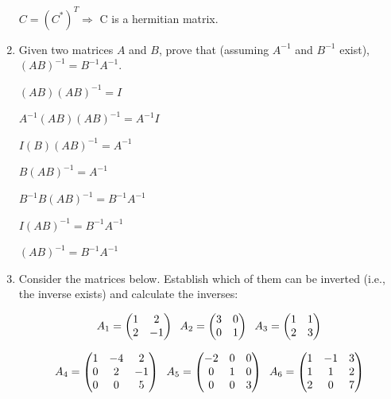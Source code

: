 \documentclass[fleqn]{article}
\begin{document}
\begin{enumerate}
      \textcolor{hwColor}{$C=(C^*)^T\Longrightarrow$ C is a hermitian matrix.}


    \item  Given two matrices $A$ and $B$,  prove that (assuming $A^{-1}$ and $B^{-1}$ exist),
    $(AB)^{-1} = B^{-1}A^{-1} $.  

    \textcolor{hwColor}{$(AB)(AB)^{-1}=I$}

    \textcolor{hwColor}{$A^{-1}(AB)(AB)^{-1}=A^{-1}I$}

    \textcolor{hwColor}{$I(B)(AB)^{-1}=A^{-1}$}

    \textcolor{hwColor}{$B(AB)^{-1}=A^{-1}$}

    \textcolor{hwColor}{$B^{-1}B(AB)^{-1}=B^{-1}A^{-1}$}

    \textcolor{hwColor}{$I(AB)^{-1}=B^{-1}A^{-1}$}

    \textcolor{hwColor}{$(AB)^{-1}=B^{-1}A^{-1}$}

    \bigbreak

    \item  Consider the matrices below. Establish which of them can be inverted (i.e., the inverse exists) and calculate the inverses: 

      $$A_1 = 
      \begin{pmatrix}
        1 & 2 \\
        2 & -1
      \end{pmatrix}\hskip 0.2truecm 
      A_2=\begin{pmatrix}
        3 & 0 \\
        0 & 1
      \end{pmatrix}\hskip 0.2truecm
      A_3=\begin{pmatrix}
        1 & 1 \\
        2 & 3
      \end{pmatrix}
      $$

      $$A_4 = 
      \begin{pmatrix}
        1 & -4 & 2 \\
        0 & 2 & -1 \\
        0 & 0 & 5
      \end{pmatrix}\hskip 0.2truecm 
      A_5=\begin{pmatrix}
        -2 & 0 & 0 \\
        0 & 1 & 0 \\
        0 & 0 & 3
      \end{pmatrix}\hskip 0.2truecm
      A_6=\begin{pmatrix}
        1 & -1 & 3 \\
        1 & 1 & 2 \\
        2 & 0 & 7
      \end{pmatrix}
      $$


\end{enumerate}
\end{document}
